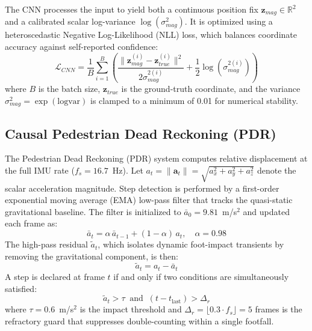 \documentclass[conference]{IEEEtran}
\begin{document}
The CNN processes the input to yield both a continuous position fix $\mathbf{z}_{mag} \in \mathbb{R}^2$ and a calibrated scalar log-variance $\log(\sigma^2_{mag})$. It is optimized using a heteroscedastic Negative Log-Likelihood (NLL) loss, which balances coordinate accuracy against self-reported confidence:
\begin{equation}
\mathcal{L}_{CNN} = \frac{1}{B} \sum_{i=1}^{B} \left( \frac{\| \mathbf{z}_{mag}^{(i)} - \mathbf{z}_{true}^{(i)} \|^2}{2\sigma^{2(i)}_{mag}} + \frac{1}{2}\log(\sigma^{2(i)}_{mag}) \right) \label{eq:nll_loss}
\end{equation}
where $B$ is the batch size, $\mathbf{z}_{true}$ is the ground-truth coordinate, and the variance $\sigma^2_{mag} = \exp(\text{logvar})$ is clamped to a minimum of 0.01 for numerical stability.

\subsection{Causal Pedestrian Dead Reckoning (PDR)}

The Pedestrian Dead Reckoning (PDR) system computes relative displacement at the full IMU rate ($f_s = 16.7$~Hz). Let $a_t = \|\mathbf{a}_t\| = \sqrt{a_x^2 + a_y^2 + a_z^2}$ denote the scalar acceleration magnitude. Step detection is performed by a first-order exponential moving average (EMA) low-pass filter that tracks the quasi-static gravitational baseline. The filter is initialized to $\bar{a}_0 = 9.81$~m/s$^2$ and updated each frame as:
\begin{equation}
\bar{a}_t = \alpha\, \bar{a}_{t-1} + (1-\alpha)\, a_t, \quad \alpha = 0.98 \label{eq:lpf}
\end{equation}
The high-pass residual $\tilde{a}_t$, which isolates dynamic foot-impact transients by removing the gravitational component, is then:
\begin{equation}
\tilde{a}_t = a_t - \bar{a}_t \label{eq:hpf}
\end{equation}
A step is declared at frame $t$ if and only if two conditions are simultaneously satisfied:
\begin{equation}
\tilde{a}_t > \tau \;\;\text{and}\;\; (t - t_{\text{last}}) > \Delta_r \label{eq:step_trigger}
\end{equation}
where $\tau = 0.6$~m/s$^2$ is the impact threshold and $\Delta_r = \lfloor 0.3 \cdot f_s \rfloor = 5$ frames is the refractory guard that suppresses double-counting within a single footfall.
\end{document}
